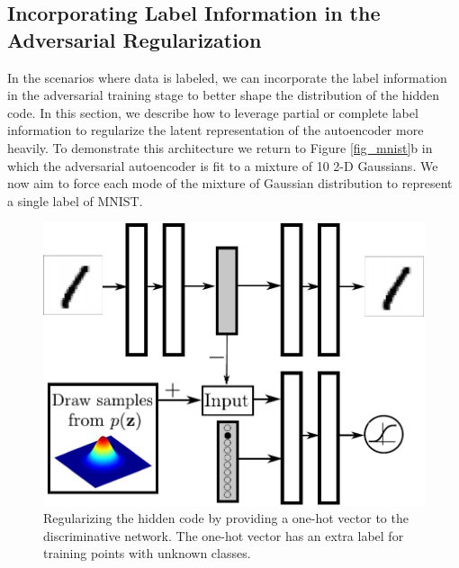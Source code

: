 \documentclass{article}
\begin{document}
\subsection{Incorporating Label Information in the Adversarial Regularization}\label{semi2}
In the scenarios where data is labeled, we can incorporate the label information in the adversarial training stage to better shape the distribution of the hidden code. 
In this section, we describe how to leverage partial or complete label information to regularize the latent representation of the autoencoder more heavily.
To demonstrate this architecture we return to Figure \ref{fig_mnist}b in which the adversarial autoencoder is fit to a mixture of 10 2-D Gaussians.
We now aim to force each mode of the mixture of Gaussian distribution to represent a single label of MNIST.

\begin{figure}[b]
\begin{center}
\centering 
\hspace{0.2cm}\includegraphics[scale=.35]{adv_ae_semi}
\caption{\label{fig_semi_adv_b}Regularizing the hidden code by providing a one-hot vector to the discriminative network. The one-hot vector has an extra label for training points with unknown classes.}
\end{center}
\end{figure}
\end{document}
